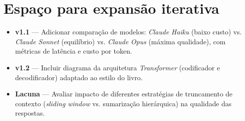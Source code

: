 \section{Espa\c{c}o para expans\~ao iterativa}

\begin{itemize}[leftmargin=*]
  \item \textbf{v1.1} --- Adicionar compara\c{c}\~ao de modelos:
        \textit{Claude Haiku} (baixo custo) vs. \textit{Claude Sonnet}
        (equil\'ibrio) vs. \textit{Claude Opus} (m\'axima qualidade),
        com m\'etricas de lat\^encia e custo por token.
  \item \textbf{v1.2} --- Incluir diagrama da arquitetura
        \textit{Transformer} (codificador e decodificador) adaptado
        ao estilo do livro.
  \item \textbf{Lacuna} --- Avaliar impacto de diferentes estrat\'egias
        de truncamento de contexto (\textit{sliding window} vs.
        sumariza\c{c}\~ao hier\'arquica) na qualidade das respostas.
\end{itemize}

